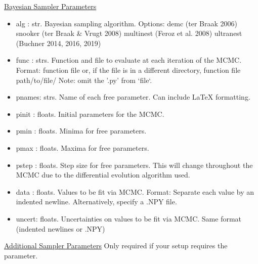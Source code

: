 \documentclass[letterpaper, 12pt]{article}
\begin{document}
\noindent \underline{Bayesian Sampler Parameters}
\begin{itemize}
\item alg   : str.  Bayesian sampling algorithm.  Options:
                      demc                 (ter Braak 2006)
                      snooker     (ter Braak \& Vrugt 2008)
                      multinest         (Feroz et al. 2008)
                      ultranest              (Buchner 2014, 2016, 2019)
\item func  : strs. Function and file to evaluate at each iteration of 
                    the MCMC.
                    Format: 
                      function file
                    or, if the file is in a different directory,
                      function file path/to/file/
                    Note: omit the '.py' from `file`.
\item pnames: strs. Name of each free parameter. Can include LaTeX 
                    formatting.
\item pinit : floats. Initial parameters for the MCMC.
\item pmin  : floats. Minima for free parameters.
\item pmax  : floats. Maxima for free parameters.
\item pstep : floats. Step size for free parameters. 
                      This will change throughout the MCMC due to the 
                      differential evolution algorithm used.
\item data  : floats. Values to be fit via MCMC. 
                    Format: Separate each value by an indented newline.
                    Alternatively, specify a .NPY file.
\item uncert: floats. Uncertainties on values to be fit via MCMC. 
                      Same format (indented newlines or .NPY)
\end{itemize}


\noindent \underline{Additional Sampler Parameters}
Only required if your setup requires the parameter.
\end{document}
